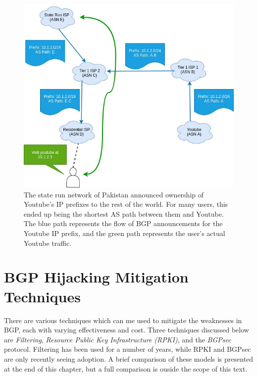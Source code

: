 \documentclass[conference]{IEEEtran}
\begin{document}
\begin{figure}
  \includegraphics[width=\linewidth]{images/bgp-hijack.jpg}
  \caption{The state run network of Pakistan announced ownership of Youtube's IP prefixes to the rest of the world.  For many users, this ended up being the shortest AS path between them and Youtube.  The blue path represents the flow of BGP announcements for the Youtube IP prefix, and the green path represents the user's actual Youtube traffic.}
  \label{fig:bgp-hijack}
\end{figure}

\section{BGP Hijacking Mitigation Techniques}
There are various techniques which can me used to mitigate the weaknesses in BGP, each with varying effectiveness and cost.  Three techniques discussed below are \emph{Filtering}, \emph{Resource Public Key Infrastructure (RPKI)}, and the \emph{BGPsec} protocol.  Filtering has been used for a number of years, while RPKI and BGPsec are only recently seeing adoption.  A brief comparison of these models is presented at the end of this chapter, but a full comparison is ouside the scope of this text.
\end{document}
